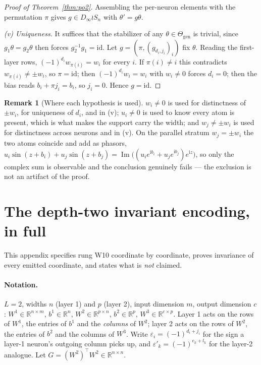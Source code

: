 \documentclass[10pt,twocolumn,letterpaper]{article}
\theoremstyle{definition}
\newtheorem{remark}[theorem]{Remark}
\newcommand{\R}{\mathbb{R}}
\newcommand{\Dinf}{D_\infty}
\newcommand{\Thgen}{\Theta_{\mathrm{gen}}}
\begin{document}
\begin{proof}[Proof of Theorem~\ref{thm:po2}]
Assembling the per-neuron elements with the permutation $\pi$ gives $g \in \Dinf \wr S_n$ with
$\theta' = g\theta$.

\emph{(v) Uniqueness.} It suffices that the stabilizer of any $\theta \in \Thgen$ is trivial, since
$g_1\theta = g_2\theta$ then forces $g_2^{-1}g_1 = \mathrm{id}$. Let $g = (\pi, (g_{d_i,j_i})_i)$
fix $\theta$. Reading the first-layer rows, $(-1)^{d_i} w_{\pi(i)} = w_i$ for every $i$. If
$\pi(i) \neq i$ this contradicts $w_{\pi(i)} \neq \pm w_i$, so $\pi = \mathrm{id}$; then
$(-1)^{d_i}w_i = w_i$ with $w_i \neq 0$ forces $d_i = 0$; then the bias reads
$b_i + \pi j_i = b_i$, so $j_i = 0$. Hence $g = \mathrm{id}$.
\end{proof}

\begin{remark}[Where each hypothesis is used]
$w_i \neq 0$ is used for distinctness of $\pm w_i$, for uniqueness of $d_i$, and in (v);
$u_i \neq 0$ is used to know every atom is present, which is what makes the support carry the
width; and $w_j \neq \pm w_i$ is used for distinctness across neurons and in (v). On the parallel
stratum $w_j = \pm w_i$ the two atoms coincide and add as phasors,
$u_i\sin(z+b_i) + u_j\sin(z+b_j) = \operatorname{Im}\big((u_ie^{\mathrm i b_i}
+ u_je^{\mathrm i b_j})e^{\mathrm i z}\big)$, so only the complex sum is observable and the
conclusion genuinely fails --- the exclusion is not an artifact of the proof.
\end{remark}

\section{The depth-two invariant encoding, in full}\label{app:w10}

This appendix specifies rung W10 coordinate by coordinate, proves invariance of every emitted
coordinate, and states what is \emph{not} claimed.

\paragraph{Notation.} $L=2$, widths $n$ (layer 1) and $p$ (layer 2), input dimension $m$, output
dimension $c$: $W^1 \in \R^{n\times m}$, $b^1 \in \R^n$, $W^2 \in \R^{p\times n}$, $b^2 \in \R^p$,
$W^3 \in \R^{c\times p}$. Layer 1 acts on the rows of $W^1$, the entries of $b^1$ and the
\emph{columns} of $W^2$; layer 2 acts on the rows of $W^2$, the entries of $b^2$ and the columns of
$W^3$. Write $\varepsilon_i = (-1)^{d_i + j_i}$ for the sign a layer-1 neuron's outgoing column
picks up, and $\varepsilon'_k = (-1)^{e_k + l_k}$ for the layer-2 analogue. Let
$G = (W^2)^\top W^2 \in \R^{n \times n}$.
\end{document}
